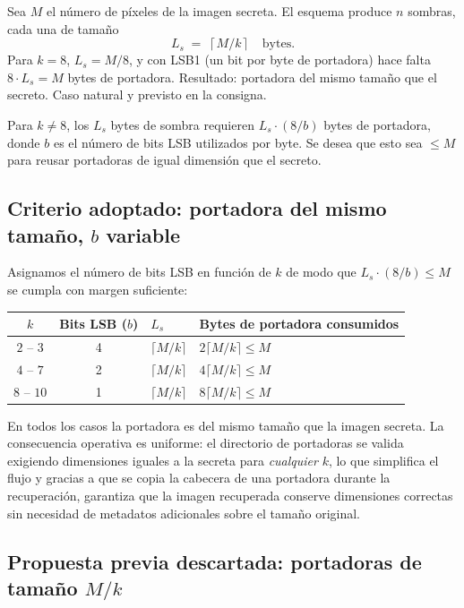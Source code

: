 \documentclass[11pt,a4paper]{article}
\begin{document}
Sea $M$ el número de píxeles de la imagen secreta. El esquema produce $n$
sombras, cada una de tamaño
\[
    L_s \;=\; \left\lceil M/k \right\rceil \quad \text{bytes}.
\]
Para $k=8$, $L_s = M/8$, y con LSB1 (un bit por byte de portadora) hace
falta $8 \cdot L_s = M$ bytes de portadora. Resultado: portadora del mismo
tamaño que el secreto. Caso natural y previsto en la consigna.

Para $k \neq 8$, los $L_s$ bytes de sombra requieren
$L_s \cdot (8/b)$ bytes de portadora, donde $b$ es el número de bits LSB
utilizados por byte. Se desea que esto sea $\leq M$ para reusar portadoras
de igual dimensión que el secreto.

\subsection*{Criterio adoptado: portadora del mismo tamaño, $b$ variable}

Asignamos el número de bits LSB en función de $k$ de modo que
$L_s \cdot (8/b) \leq M$ se cumpla con margen suficiente:

\begin{center}
\begin{tabular}{ccll}
\toprule
$k$ & Bits LSB ($b$) & $L_s$ & Bytes de portadora consumidos \\
\midrule
$2$ -- $3$ & 4 & $\lceil M/k\rceil$ & $2\lceil M/k\rceil \leq M$ \\
$4$ -- $7$ & 2 & $\lceil M/k\rceil$ & $4\lceil M/k\rceil \leq M$ \\
$8$ -- $10$ & 1 & $\lceil M/k\rceil$ & $8\lceil M/k\rceil \leq M$ \\
\bottomrule
\end{tabular}
\end{center}

\noindent En todos los casos la portadora es del mismo tamaño que la
imagen secreta. La consecuencia operativa es uniforme: el directorio de
portadoras se valida exigiendo dimensiones iguales a la secreta para
\emph{cualquier} $k$, lo que simplifica el flujo y gracias a que se copia
la cabecera de una portadora durante la recuperación, garantiza que la
imagen recuperada conserve dimensiones correctas sin necesidad de
metadatos adicionales sobre el tamaño original.

\subsection*{Propuesta previa descartada: portadoras de tamaño $M/k$}
\end{document}
